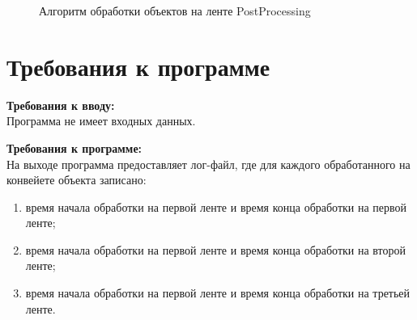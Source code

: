 \documentclass[a4paper,14pt]{report}
\begin{document}
\begin{figure}
\caption{Алгоритм обработки объектов на ленте PostProcessing}
\label{fig:image}
\end{figure}

\newpage

\section*{Требования к программе}

\textbf{Требования к вводу:}\\
Программа не имеет входных данных.

\textbf{Требования к программе:}\\
На выходе программа предоставляет лог-файл, где для каждого обработанного на конвейете объекта записано:
\begin{enumerate}
	\item время начала обработки на первой ленте и время конца обработки на первой ленте;
	\item время начала обработки на первой ленте и время конца обработки на второй ленте;
	\item время начала обработки на первой ленте и время конца обработки на третьей ленте.
\end{enumerate}
\end{document}
